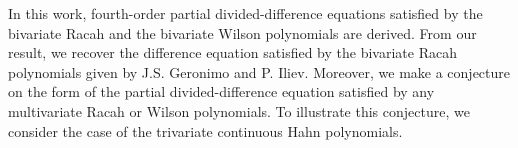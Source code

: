 \documentclass[11pt]{article}
\begin{document}
In this work,   fourth-order partial divided-difference equations  satisfied by the bivariate Racah and the  bivariate Wilson polynomials are derived. From our result, we recover the difference equation satisfied by the bivariate Racah polynomials given by J.S. Geronimo and P. Iliev. Moreover, we make a conjecture on the form of the partial divided-difference equation satisfied by any multivariate Racah or Wilson polynomials. To illustrate this conjecture, we consider the case of the trivariate continuous Hahn polynomials.
%
%
%
%
%
\end{document}
